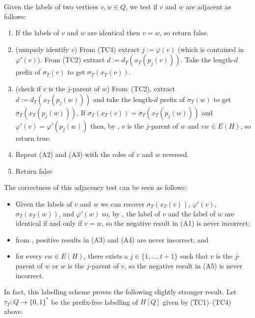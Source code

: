\documentclass[kpfonts]{patmorin}
\newcommand{\snote}[1]{\fcolorbox{red}{yellow}{#1}}
\begin{document}
Given the labels of two vertices $v,w\in Q$, we test if $v$ and $w$ are adjacent as follows:
\begin{enumerate}[label={(A\arabic*)}, ref={A\arabic*}, noitemsep]
  \item If the labels of $v$ and $w$ are identical then $v=w$, so return false.

  \item (uniquely identify $v$) From (TC4) extract $j:=\varphi(v)$ (which is contained in $\varphi'(v)$).  From (TC2) extract $d:=d_T(x_T(p_j(v)))$. Take the length-$d$ prefix of $\sigma_T(v)$ to get $\sigma_T(x_T(v))$.

  \item (check if $v$ is the $j$-parent of $w$) From~(TC2), extract $d:=d_T(x_T(p_j(w)))$ and take the length-$d$ prefix of $\sigma_T(w)$ to get $\sigma_T(x_T(p_j(w)))$.  If $\sigma_T(x_T(v))=\sigma_T(x_T(p_j(w)))$ and $\varphi'(v)=\varphi'(p_j(w))$ then, by , $v$ is the $j$-parent of $w$ and $vw\in E(H)$, so return true.

  \item Repeat (A2) and (A3) with the roles of $v$ and $w$ reversed. %

  \item Return false
\end{enumerate}

The correctness of this adjacency test can be seen as follows:
\begin{itemize}
  \item Given the labels of $v$ and $w$ we can recover $\sigma_T(x_T(v))$, $\varphi'(v)$, $\sigma_T(x_T(w))$, and $\varphi'(w)$ so, by , the label of $v$ and the label of $w$ are identical if and only if $v=w$, so the negative result in (A1) is never incorrect;
  \item from , positive results in (A3) and (A4) are never incorrect; and
  \item for every $vw\in E(H)$, there exists a $j\in\{1,\ldots,t+1\}$ such that $v$ is the $j$-parent of $w$ or $w$ is the $j$-parent of $v$, so the negative result in (A5) is never incorrect.
\end{itemize}
In fact, this labelling scheme proves the following slightly stronger result. Let $\tau_T:Q\to\{0,1\}^*$ be the prefix-free labelling of $H[Q]$ given by (TC1)--(TC4) above.
\end{document}
